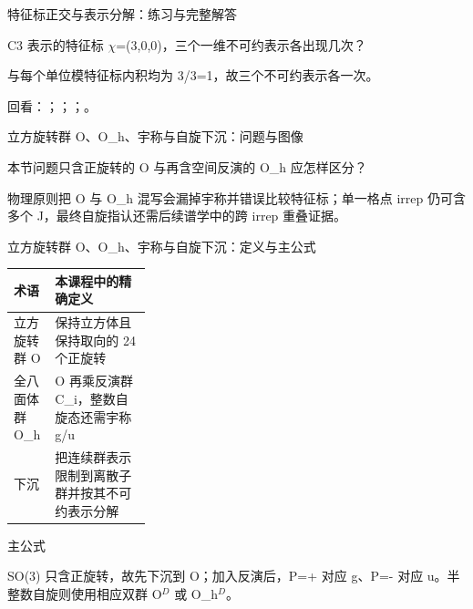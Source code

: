 \begin{frame}[t]{特征标正交与表示分解：练习与完整解答}
\footnotesize
\begin{block}{}C3 表示的特征标 \ensuremath{\chi}=(3,0,0)，三个一维不可约表示各出现几次？\end{block}
\begin{exampleblock}{}与每个单位模特征标内积均为 3/\allowbreak{}3=1，故三个不可约表示各一次。\end{exampleblock}
\vfill
\scriptsize 回看：；；；。
\end{frame}

\begin{frame}[t]{立方旋转群 O、O\_h、宇称与自旋下沉：问题与图像}
\footnotesize
\begin{block}{本节问题}只含正旋转的 O 与再含空间反演的 O\_h 应怎样区分？\end{block}
\begin{block}{物理原则}\quad 把 O 与 O\_h 混写会漏掉宇称并错误比较特征标；单一格点 irrep 仍可含多个 J，最终自旋指认还需后续谱学中的跨 irrep 重叠证据。\end{block}
\end{frame}

\begin{frame}[t]{立方旋转群 O、O\_h、宇称与自旋下沉：定义与主公式}
\footnotesize\begin{tabularx}{\linewidth}{p{0.30\linewidth}Y}
\toprule 术语 & 本课程中的精确定义\\\midrule
{} 立方旋转群 O & 保持立方体且保持取向的 24 个正旋转\\
 全八面体群 O\_h & O 再乘反演群 C\_i，整数自旋态还需宇称 g/\allowbreak{}u\\
 下沉 & 把连续群表示限制到离散子群并按其不可约表示分解\\
\bottomrule\end{tabularx}\vspace{0.15cm}
\begin{block}{ 主公式}\centering{}\end{block}
SO(3) 只含正旋转，故先下沉到 O；加入反演后，P=+ 对应 g、P=- 对应 u。半整数自旋则使用相应双群 O\ensuremath{^{D}} 或 O\_h\ensuremath{^{D}}。
\end{frame}


